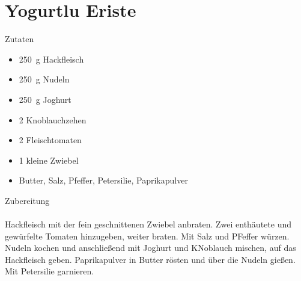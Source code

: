 \section*{Yogurtlu Eriste}
\ihead{}\ohead{}
\cfoot{}
{\Large Zutaten}
\begin{multicols}{2}
\begin{itemize}
    \item \SI{250}{g} Hackfleisch
    \item \SI{250}{g} Nudeln
    \item \SI{250}{g} Joghurt
    \item \num{2} Knoblauchzehen
    \item \num{2} Fleischtomaten
    \item \num{1} kleine Zwiebel
    \item Butter, Salz, Pfeffer, Petersilie, Paprikapulver
\end{itemize}
\end{multicols}
\noindent
{\Large Zubereitung}\\
\\
Hackfleisch mit der fein geschnittenen Zwiebel anbraten. 
Zwei enthäutete und gewürfelte Tomaten hinzugeben, weiter braten.
Mit Salz und PFeffer würzen.
Nudeln kochen und anschließend mit Joghurt und KNoblauch mischen, auf das Hackfleisch geben.
Paprikapulver in Butter rösten und über die Nudeln gießen. 
Mit Petersilie garnieren.

